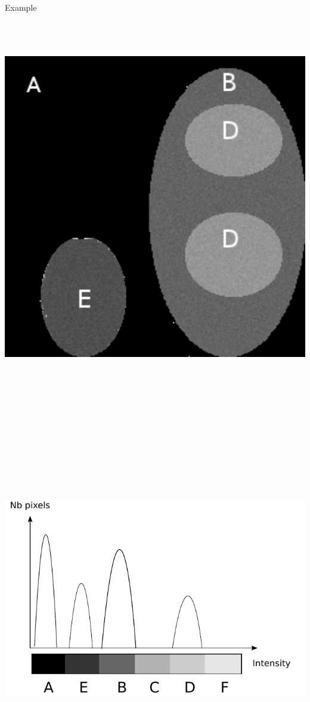 \begin{frame}
			\begin{exampleblock}{Example}
				\begin{columns}[c]
					\column{5em}
					\includegraphics[trim= -5mm 0mm 0mm 0mm, clip, height=1\textwidth]{image/lobe_img.png}
					\column{5em}
					\includegraphics[trim= -5mm 0mm 0mm 0mm, clip, height=1.2\textwidth]{image/lobe_hist.pdf}

\end{columns}
\end{exampleblock}
\end{frame}
